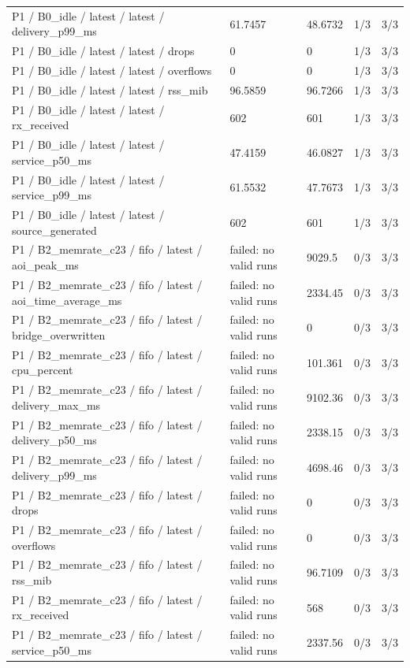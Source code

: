 \begin{tabular}{@{}lllll@{}}
P1 / B0\_idle / latest / latest / delivery\_p99\_ms & 61.7457 & 48.6732 & 1/3 & 3/3 \\
P1 / B0\_idle / latest / latest / drops & 0 & 0 & 1/3 & 3/3 \\
P1 / B0\_idle / latest / latest / overflows & 0 & 0 & 1/3 & 3/3 \\
P1 / B0\_idle / latest / latest / rss\_mib & 96.5859 & 96.7266 & 1/3 & 3/3 \\
P1 / B0\_idle / latest / latest / rx\_received & 602 & 601 & 1/3 & 3/3 \\
P1 / B0\_idle / latest / latest / service\_p50\_ms & 47.4159 & 46.0827 & 1/3 & 3/3 \\
P1 / B0\_idle / latest / latest / service\_p99\_ms & 61.5532 & 47.7673 & 1/3 & 3/3 \\
P1 / B0\_idle / latest / latest / source\_generated & 602 & 601 & 1/3 & 3/3 \\
P1 / B2\_memrate\_c23 / fifo / latest / aoi\_peak\_ms & failed: no valid runs & 9029.5 & 0/3 & 3/3 \\
P1 / B2\_memrate\_c23 / fifo / latest / aoi\_time\_average\_ms & failed: no valid runs & 2334.45 & 0/3 & 3/3 \\
P1 / B2\_memrate\_c23 / fifo / latest / bridge\_overwritten & failed: no valid runs & 0 & 0/3 & 3/3 \\
P1 / B2\_memrate\_c23 / fifo / latest / cpu\_percent & failed: no valid runs & 101.361 & 0/3 & 3/3 \\
P1 / B2\_memrate\_c23 / fifo / latest / delivery\_max\_ms & failed: no valid runs & 9102.36 & 0/3 & 3/3 \\
P1 / B2\_memrate\_c23 / fifo / latest / delivery\_p50\_ms & failed: no valid runs & 2338.15 & 0/3 & 3/3 \\
P1 / B2\_memrate\_c23 / fifo / latest / delivery\_p99\_ms & failed: no valid runs & 4698.46 & 0/3 & 3/3 \\
P1 / B2\_memrate\_c23 / fifo / latest / drops & failed: no valid runs & 0 & 0/3 & 3/3 \\
P1 / B2\_memrate\_c23 / fifo / latest / overflows & failed: no valid runs & 0 & 0/3 & 3/3 \\
P1 / B2\_memrate\_c23 / fifo / latest / rss\_mib & failed: no valid runs & 96.7109 & 0/3 & 3/3 \\
P1 / B2\_memrate\_c23 / fifo / latest / rx\_received & failed: no valid runs & 568 & 0/3 & 3/3 \\
P1 / B2\_memrate\_c23 / fifo / latest / service\_p50\_ms & failed: no valid runs & 2337.56 & 0/3 & 3/3 \\

\end{tabular}
